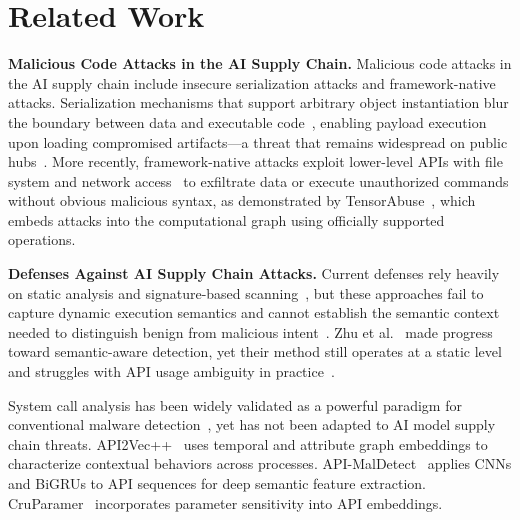 \section{Related Work}

\noindent \textbf{Malicious Code Attacks in the AI Supply Chain.}
Malicious code attacks in the AI supply chain include insecure serialization attacks and framework-native attacks. Serialization mechanisms that support arbitrary object instantiation blur the boundary between data and executable code~\cite{NEURIPS2019_bdbca288, 3368680}, enabling payload execution upon loading compromised artifacts—a threat that remains widespread on public hubs~\cite{3765037, casey2024largescaleexploitinstrumentationstudy, MLSYS2025_75bb91b9}. More recently, framework-native attacks exploit lower-level APIs with file system and network access~\cite{199317} to exfiltrate data or execute unauthorized commands without obvious malicious syntax, as demonstrated by TensorAbuse~\cite{zhu2025}, which embeds attacks into the computational graph using officially supported operations.

\noindent \textbf{Defenses Against AI Supply Chain Attacks.}
Current defenses rely heavily on static analysis and signature-based scanning~\cite{fickling, picklescanning}, but these approaches fail to capture dynamic execution semantics and cannot establish the semantic context needed to distinguish benign from malicious intent~\cite{ohayon2026safepicklerobustgenericml}. Zhu et al.~\cite{zhu2025} made progress toward semantic-aware detection, yet their method still operates at a static level and struggles with API usage ambiguity in practice~\cite{3735968}.

System call analysis has been widely validated as a powerful paradigm for conventional malware detection~\cite{102526,101007}, yet has not been adapted to AI model supply chain threats. API2Vec++~\cite{10586831} uses temporal and attribute graph embeddings to characterize contextual behaviors across processes. API-MalDetect~\cite{103704} applies CNNs and BiGRUs to API sequences for deep semantic feature extraction. CruParamer~\cite{9715123} incorporates parameter sensitivity into API embeddings.
